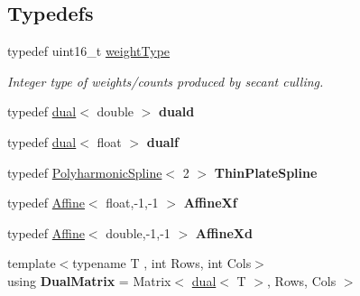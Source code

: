\subsection*{Typedefs}
\begin{DoxyCompactItemize}
\item 
\hypertarget{namespace_d_r_d_s_p_a955ec80e50da3c3f17008affbdd1ca04}{typedef uint16\-\_\-t \hyperlink{namespace_d_r_d_s_p_a955ec80e50da3c3f17008affbdd1ca04}{weight\-Type}}\label{namespace_d_r_d_s_p_a955ec80e50da3c3f17008affbdd1ca04}

\begin{DoxyCompactList}\small\item\em Integer type of weights/counts produced by secant culling. \end{DoxyCompactList}\item 
\hypertarget{namespace_d_r_d_s_p_aaf04200393245234d20ef0f7d3402237}{typedef \hyperlink{struct_d_r_d_s_p_1_1dual}{dual}$<$ double $>$ {\bfseries duald}}\label{namespace_d_r_d_s_p_aaf04200393245234d20ef0f7d3402237}

\item 
\hypertarget{namespace_d_r_d_s_p_a0a9ed0f34fa1df3afede25b5abb161d3}{typedef \hyperlink{struct_d_r_d_s_p_1_1dual}{dual}$<$ float $>$ {\bfseries dualf}}\label{namespace_d_r_d_s_p_a0a9ed0f34fa1df3afede25b5abb161d3}

\item 
\hypertarget{namespace_d_r_d_s_p_a49250c7790b7c79433a3f32fcfb23089}{typedef \hyperlink{struct_d_r_d_s_p_1_1_polyharmonic_spline}{Polyharmonic\-Spline}$<$ 2 $>$ {\bfseries Thin\-Plate\-Spline}}\label{namespace_d_r_d_s_p_a49250c7790b7c79433a3f32fcfb23089}

\item 
\hypertarget{namespace_d_r_d_s_p_a06aaf3bfc0fc56e67bce0b22df772825}{typedef \hyperlink{struct_d_r_d_s_p_1_1_affine}{Affine}$<$ float,-\/1,-\/1 $>$ {\bfseries Affine\-Xf}}\label{namespace_d_r_d_s_p_a06aaf3bfc0fc56e67bce0b22df772825}

\item 
\hypertarget{namespace_d_r_d_s_p_a4549d29ff4f8f0abe27ad69ad06e5ff2}{typedef \hyperlink{struct_d_r_d_s_p_1_1_affine}{Affine}$<$ double,-\/1,-\/1 $>$ {\bfseries Affine\-Xd}}\label{namespace_d_r_d_s_p_a4549d29ff4f8f0abe27ad69ad06e5ff2}

\item 
\hypertarget{namespace_d_r_d_s_p_afe9abf0bfaef3e2c6f7c3d258c0601e3}{{\footnotesize template$<$typename T , int Rows, int Cols$>$ }\\using {\bfseries Dual\-Matrix} = Matrix$<$ \hyperlink{struct_d_r_d_s_p_1_1dual}{dual}$<$ T $>$, Rows, Cols $>$}\label{namespace_d_r_d_s_p_afe9abf0bfaef3e2c6f7c3d258c0601e3}


\end{DoxyCompactItemize}
